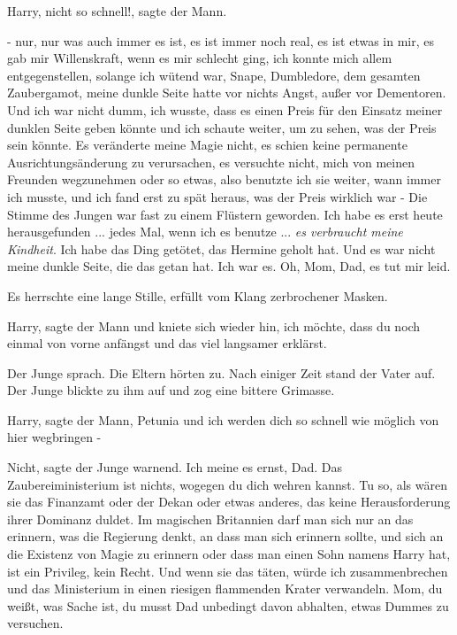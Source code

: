 \glqq{}Harry, nicht so schnell!\grqq{}, sagte der Mann.

\glqq{}- nur, nur was auch immer es ist, es ist immer noch real, es ist etwas in
mir, es gab mir Willenskraft, wenn es mir schlecht ging, ich konnte mich allem
entgegenstellen, solange ich wütend war, Snape, Dumbledore, dem gesamten
Zaubergamot, meine dunkle Seite hatte vor nichts Angst, außer vor Dementoren.
Und ich war nicht dumm, ich wusste, dass es einen Preis für den Einsatz meiner
dunklen Seite geben könnte und ich schaute weiter, um zu sehen, was der Preis
sein könnte. Es veränderte meine Magie nicht, es schien keine permanente
Ausrichtungsänderung zu verursachen, es versuchte nicht, mich von meinen
Freunden wegzunehmen oder so etwas, also benutzte ich sie weiter, wann immer ich
musste, und ich fand erst zu spät heraus, was der Preis wirklich war -\grqq{}
Die Stimme des Jungen war fast zu einem Flüstern geworden. \glqq{}Ich habe es
erst heute herausgefunden ... jedes Mal, wenn ich es benutze ... \emph{es
verbraucht meine Kindheit}. Ich habe das Ding getötet, das Hermine geholt hat.
Und es war nicht meine dunkle Seite, die das getan hat. Ich war es. Oh, Mom,
Dad, es tut mir leid.\grqq{}

Es herrschte eine lange Stille, erfüllt vom Klang zerbrochener Masken.

\glqq{}Harry\grqq{}, sagte der Mann und kniete sich wieder hin, \glqq{}ich möchte,
dass du noch einmal von vorne anfängst und das viel langsamer erklärst.\grqq{}

Der Junge sprach. Die Eltern hörten zu. Nach einiger Zeit stand der Vater auf.
Der Junge blickte zu ihm auf und zog eine bittere Grimasse.

\glqq{}Harry\grqq{}, sagte der Mann, \glqq{}Petunia und ich werden dich so schnell
wie möglich von hier wegbringen -\grqq{}

\glqq{}Nicht\grqq{}, sagte der Junge warnend. \glqq{}Ich meine es ernst, Dad. Das
Zaubereiministerium ist nichts, wogegen du dich wehren kannst. Tu so, als wären
sie das Finanzamt oder der Dekan oder etwas anderes, das keine Herausforderung
ihrer Dominanz duldet. Im magischen Britannien darf man sich nur an das
erinnern, was die Regierung denkt, an dass man sich erinnern sollte, und sich an
die Existenz von Magie zu erinnern oder dass man einen Sohn namens Harry hat,
ist ein Privileg, kein Recht. Und wenn sie das täten, würde ich zusammenbrechen
und das Ministerium in einen riesigen flammenden Krater verwandeln. Mom, du
weißt, was Sache ist, du musst Dad unbedingt davon abhalten, etwas Dummes zu
versuchen.\grqq{}


